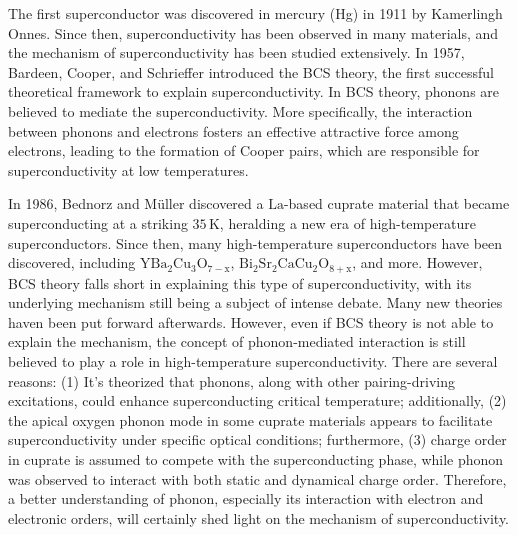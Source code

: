 \documentclass[11pt]{article}
\begin{document}
The first superconductor was discovered in mercury (Hg) in 1911 by Kamerlingh Onnes. Since then, superconductivity has been observed in many materials, and the mechanism of superconductivity has been studied extensively. In 1957, Bardeen, Cooper, and Schrieffer introduced the BCS theory, the first successful theoretical framework to explain superconductivity\cite{bardeen_theory_1957}. In BCS theory, phonons are believed to mediate the superconductivity. More specifically, the interaction between phonons and electrons fosters an effective attractive force among electrons, leading to the formation of Cooper pairs, which are responsible for superconductivity at low temperatures\cite{bardeen_theory_1957}. 

In 1986, Bednorz and Müller discovered a $\mathrm{La}$-based cuprate material that became superconducting at a striking $35\,\mathrm{K}$\cite{bednorz_possible_1986}, heralding a new era of high-temperature superconductors. Since then, many  high-temperature superconductors have been discovered, including $\mathrm{YBa_{2}Cu_{3}O_{7-x}}$\cite{wu_superconductivity_1987}, $\mathrm{Bi_2Sr_2CaCu_{2}O_{8+x}}$\cite{maeda_a_1988}, and more. However, BCS theory falls short in explaining this type of superconductivity, with its underlying mechanism still being a subject of intense debate. Many new theories haven been put forward afterwards. However, even if BCS theory is not able to explain the mechanism, the concept of phonon-mediated interaction is still believed to play a role in high-temperature superconductivity. There are several reasons: (1) It's theorized that phonons, along with other pairing-driving excitations, could enhance superconducting critical temperature\cite{braicovich_determining_2020}; additionally, (2) the apical oxygen phonon mode in some cuprate materials appears to facilitate superconductivity under specific optical conditions\cite{kaiser_optically_2014}; furthermore, (3) charge order in cuprate is assumed to compete with the superconducting phase, while phonon was observed to interact with both static and dynamical charge order\cite{arpaia_charge_2021,comin_resonant_2016,canosa_resonant_2014, hucker_competing_2014, chang_direct_2012,ghiringhelli_long-range_2012,wang_charge_2021,lin_strongly_2020, huang_quantum_2021,miao_incommensurate_2018,tacon_inelastic_2014,li_multiorbital_2020,braicovich_determining_2020,chaix_dispersive_2017,peng_enhanced_2020}. Therefore, a better understanding of phonon, especially its interaction with electron and electronic orders, will certainly shed light on the mechanism of superconductivity.  
\end{document}
